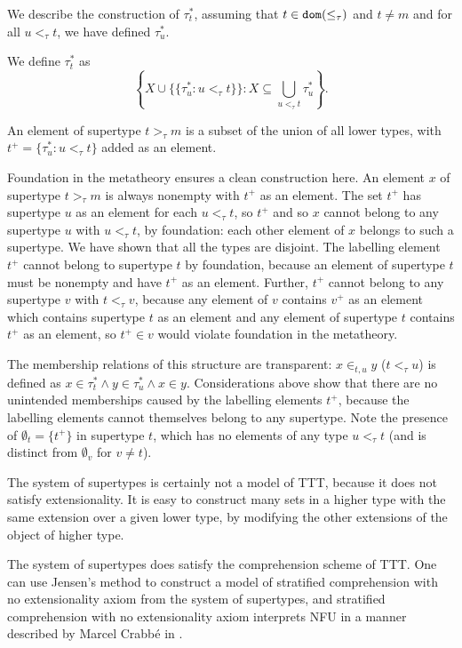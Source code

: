 \documentclass[112pt]{article}
\theoremstyle{definition}
\theoremstyle{remark}
\begin{document}
We describe the construction of $\tau^*_t$, assuming that $t \in {\tt dom}(\leq_\tau)$ and $t \neq m$ and for all $u <_\tau t$, we have
defined $\tau^*_u$.

We define $\tau^*_t$ as $$\left\{X \cup \{\{\tau^*_u:u <_\tau t\}\}:X \subseteq \bigcup_{u <_\tau t}\tau^*_u\right\}.$$

An element of supertype $t>_\tau m$ is a subset of the union of all lower types, with $t^+ = \{\tau^*_u:u <_\tau t\}$ added as an element.

Foundation in the metatheory ensures a clean construction here.  An element $x$ of supertype $t>_\tau m$ is always nonempty with $t^+$ as an element.  The set $t^+$ has supertype $u$ as an element for each $u <_\tau t$, so $t^+$ and so $x$  cannot belong to any supertype $u$ with $u <_\tau t$, by foundation:  each other element of $x$ belongs to such a supertype.  We have shown that all the types are disjoint.  The labelling element $t^+$ cannot belong to supertype $t$ by foundation, because an element of supertype $t$ must be nonempty and have $t^+$ as an element.  Further, $t^+$ cannot belong to any supertype $v$ with $t <_\tau v$, because any element of $v$ contains $v^+$ as an element which contains supertype $t$ as an element and any element of supertype $t$ contains $t^+$ as an element, so $t^+ \in v$ would violate foundation in the metatheory.

The membership relations of this structure are transparent:  $x \in_{t,u} y$ ($t <_\tau u$) is defined as
$x \in \tau^*_t \wedge y \in \tau^*_u \wedge x \in y$.   Considerations above show that there are no unintended memberships caused by the labelling elements $t^+$, because the labelling elements cannot themselves belong to any supertype.  Note the presence of $\emptyset_t = \{t^+\}$ in supertype $t$, which has no elements of any type $u <_\tau t$ (and is distinct from $\emptyset_v$ for $v \neq t$).

The system of supertypes is certainly not a model of TTT, because it does not satisfy extensionality.  It is easy to construct
many sets in a higher type with the same extension over a given lower type, by modifying the other extensions of the object of higher type.

The system of supertypes does satisfy the comprehension scheme of TTT.  One can use Jensen's method to construct a model of stratified comprehension with no extensionality axiom from the system of supertypes, and stratified comprehension with no extensionality axiom interprets NFU in a manner described by Marcel Crabb\'e in \cite{marcelsf}.
\end{document}
